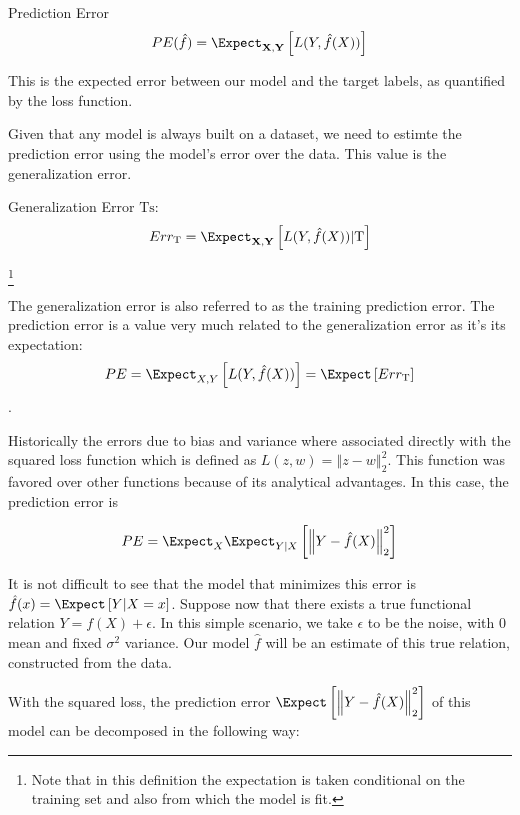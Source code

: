 \begin{definition}{Prediction Error}
	$$ PE(\hat{f})= \Expect_{\textbf{X},\textbf{Y}} \left[ L(Y,\hat{f}(X))\right]$$
\end{definition}

This is the expected error between our model and the target labels, as quantified by the loss function. 

Given that any model is always built on a dataset, we need to estimte the prediction error using the model's error over the data.  This value is the generalization error.

\begin{definition}{Generalization Error}
	 $\mathrm{Ts}$:
	$$ Err_{\mathrm{T}} =  \Expect_{\textbf{X},\textbf{Y}} \left[ L(Y,\hat{f}(X)) |  \mathrm{T}\right]$$
\end{definition}\footnote{Note that in this definition the expectation is taken conditional on the training set and also from which the model is fit.}

The generalization error is also referred to as the training prediction error. The prediction error is a value very much related to the generalization error as it's its expectation:
$$ PE = \Expect_{X,Y} \left[ L(Y,\hat{f}(X))\right] =  \Expect \left[ Err_{\mathrm{T}}  \right]$$.

Historically the errors due to bias and variance where associated directly with the squared loss function which is defined as $L(z,w) = \left\Vert z-w \right\Vert^2_2$. This function was favored over other functions because of its analytical advantages.  In this case, the prediction error is

\begin{equation}\label{squaredPE}
PE = \Expect_X \Expect_{Y|X} \left[ \left\Vert  Y - \hat{f}(X)  \right\Vert_2^2 \right]
\end{equation}

It is not difficult to see that the model that minimizes this error is $\hat{f}(x) = \Expect \left[ Y | X=x \right] $. Suppose now that there exists a true functional relation $Y = f(X) + \epsilon$. 
In this simple scenario, we take $\epsilon$ to be the noise, with $0$ mean and fixed $\sigma^2$ variance. Our model $\hat{f}$ will be an estimate of this true relation, constructed from the data. 

With the squared loss, the prediction error $\Expect \left[ \left\Vert Y  - \hat{f}(X) \right\Vert_2^2 \right]$ of this model can be decomposed in the following way:

